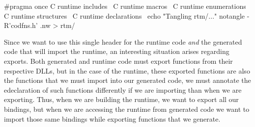 \documentclass{article}%
\begin{document}
\nwenddocs{}\endmoddef\nwstartdeflinemarkup\nwenddeflinemarkup
#pragma once
\LA{}C runtime includes~{\nwtagstyle{}}\RA{}
\LA{}C runtime macros~{\nwtagstyle{}}\RA{}
\LA{}C runtime enumerations~{\nwtagstyle{}}\RA{}
\LA{}C runtime structures~{\nwtagstyle{}}\RA{}
\LA{}C runtime declarations~{\nwtagstyle{}}\RA{}
\eatline
{}\nwendcode{}\nwdocspar
\nwenddocs{}\plusendmoddef\nwstartdeflinemarkup{}\nwenddeflinemarkup
echo "Tangling rtm/..."
notangle -R'codfns.h' .nw > rtm/
\nwendcode{}\nwdocspar

Since we want to use this single header
for the runtime code \emph{and} the generated code
that will import the runtime,
an interesting situation arises regarding exports.
Both generated and runtime code must export functions
from their respective DLLs,
but in the case of the runtime,
these exported functions are also the functions
that we must import into our generated code,
we must annotate the edeclaration of such functions
differently if we are importing
than when we are exporting.
Thus, when we are building the runtime, 
we want to export all our bindings,
but when we are accessing the runtime from generated code
we want to import those same bindings
while exporting functions that we generate.
\end{document}
